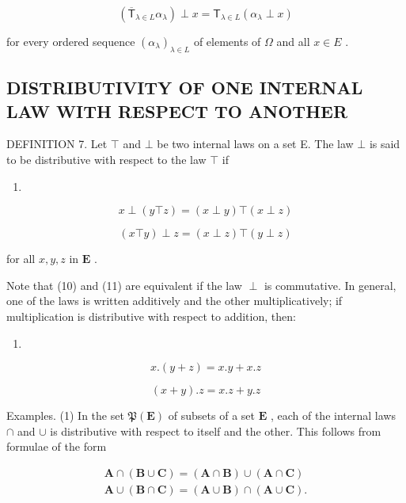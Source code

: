 \[
\left(\overline {{\mathsf {T}}} _ {\lambda \in L} \alpha_ {\lambda}\right) \perp x = \mathsf {T} _ {\lambda \in L} (\alpha_ {\lambda} \perp x)\tag{9}
\]

for every ordered sequence \((\alpha_{\lambda})_{\lambda \in L}\) of elements of \(\Omega\) and all \(x\in E\) .

\subsection{DISTRIBUTIVITY OF ONE INTERNAL LAW WITH RESPECT TO ANOTHER}

DEFINITION 7. Let \(\top\) and \(\bot\) be two internal laws on a set E. The law \(\bot\) is said to be distributive with respect to the law \(\top\) if

\begin{enumerate}
\def\labelenumi{(\arabic{enumi})}
\setcounter{enumi}{9}
\tightlist
\item
\end{enumerate}

\[
x \perp (y \top z) = (x \perp y) \top (x \perp z)\tag{11}
\]

\[
(x \top y) \perp z = (x \perp z) \top (y \perp z)
\]

for all \(x, y, z\) in \(\mathbf{E}\) .

Note that (10) and (11) are equivalent if the law \(\perp\) is commutative. In general, one of the laws is written additively and the other multiplicatively; if multiplication is distributive with respect to addition, then:

\begin{enumerate}
\def\labelenumi{(\arabic{enumi})}
\setcounter{enumi}{11}
\tightlist
\item
\end{enumerate}

\[
x. (y + z) = x. y + x. z\tag{13}
\]

\[
(x + y). z = x. z + y. z
\]

Examples. (1) In the set \(\mathfrak{P}(\mathbf{E})\) of subsets of a set \(\mathbf{E}\) , each of the internal laws \(\cap\) and \(\cup\) is distributive with respect to itself and the other. This follows from formulae of the form

\[
\begin{array}{l} \mathbf {A} \cap (\mathbf {B} \cup \mathbf {C}) = (\mathbf {A} \cap \mathbf {B}) \cup (\mathbf {A} \cap \mathbf {C}) \\ \mathbf {A} \cup (\mathbf {B} \cap \mathbf {C}) = (\mathbf {A} \cup \mathbf {B}) \cap (\mathbf {A} \cup \mathbf {C}). \end{array}
\]

